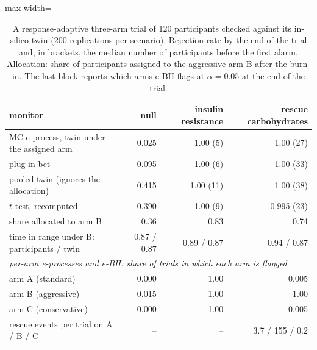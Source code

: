 \documentclass[11pt]{article}
\theoremstyle{remark}
\begin{document}
\begin{table}[t]
\centering
\caption{A response-adaptive three-arm trial of 120 participants checked
against its in-silico twin (200 replications per scenario). Rejection rate by
the end of the trial and, in brackets, the median number of participants
before the first alarm. Allocation: share of participants assigned to the
aggressive arm B after the burn-in. The last block reports which arms e-BH
flags at $\alpha = 0.05$ at the end of the trial.}
\label{tab:trial3}
\begin{adjustbox}{max width=\textwidth}
\begin{tabular}{lrrr}
\toprule
monitor & null & insulin resistance & rescue carbohydrates \\
\midrule
MC e-process, twin under the assigned arm & 0.025 & 1.00 (5) & 1.00 (27) \\
plug-in bet & 0.095 & 1.00 (6) & 1.00 (33) \\
pooled twin (ignores the allocation) & 0.415 & 1.00 (11) & 1.00 (38) \\
$t$-test, recomputed & 0.390 & 1.00 (9) & 0.995 (23) \\
\midrule
share allocated to arm B & 0.36 & 0.83 & 0.74 \\
time in range under B: participants / twin & 0.87 / 0.87 & 0.89 / 0.87 & 0.94 / 0.87 \\
\midrule
\multicolumn{4}{l}{\emph{per-arm e-processes and e-BH: share of trials in which each arm is flagged}} \\
arm A (standard) & 0.000 & 1.00 & 0.005 \\
arm B (aggressive) & 0.015 & 1.00 & 1.00 \\
arm C (conservative) & 0.000 & 1.00 & 0.005 \\
rescue events per trial on A / B / C & -- & -- & 3.7 / 155 / 0.2 \\
\bottomrule
\end{tabular}
\end{adjustbox}
\end{table}
\end{document}
